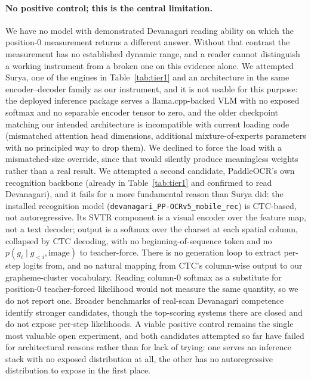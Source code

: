 \documentclass{article}
\begin{document}
\paragraph{No positive control; this is the central limitation.} We have no model with
demonstrated Devanagari reading ability on which the position-0 measurement returns a different
answer. Without that contrast the measurement has no established dynamic range, and a reader
cannot distinguish a working instrument from a broken one on this evidence alone. We attempted
Surya, one of the engines in Table~\ref{tab:tier1} and an architecture in the same encoder--decoder
family as our instrument, and it is not usable for this purpose: the deployed inference package
serves a llama.cpp-backed VLM with no exposed softmax and no separable encoder tensor to zero,
and the older checkpoint matching our intended architecture is incompatible with current loading
code (mismatched attention head dimensions, additional mixture-of-experts parameters with no
principled way to drop them). We declined to force the load with a mismatched-size override,
since that would silently produce meaningless weights rather than a real result. We attempted a
second candidate, PaddleOCR's own recognition backbone (already in Table~\ref{tab:tier1} and
confirmed to read Devanagari), and it fails for a more fundamental reason than Surya did: the
installed recognition model (\texttt{devanagari\_PP-OCRv5\_mobile\_rec}) is CTC-based, not
autoregressive. Its SVTR component is a visual encoder over the feature map, not a text decoder;
output is a softmax over the charset at each spatial column, collapsed by CTC decoding, with no
beginning-of-sequence token and no $p(g_i \mid g_{<i}, \text{image})$ to teacher-force. There is
no generation loop to extract per-step logits from, and no natural mapping from CTC's column-wise
output to our grapheme-cluster vocabulary. Reading column-0 softmax as a substitute for
position-0 teacher-forced likelihood would not measure the same quantity, so we do not report
one. Broader benchmarks of real-scan Devanagari competence \citep{singh2026devanagari} identify
stronger candidates, though the top-scoring systems there are closed and do not expose per-step
likelihoods. A viable positive control remains the single most valuable open experiment, and
both candidates attempted so far have failed for architectural reasons rather than for lack of
trying: one serves an inference stack with no exposed distribution at all, the other has no
autoregressive distribution to expose in the first place.
\end{document}
